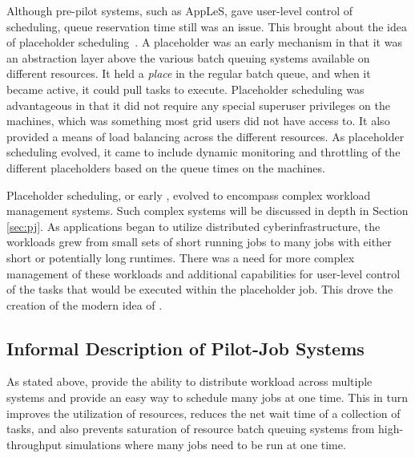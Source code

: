 \documentclass{sig-alternate}
\begin{document}
Although pre-pilot systems, such as AppLeS, gave user-level control of
scheduling, queue reservation time still was an issue. This brought
about the idea of placeholder
scheduling~\cite{Pinchak02practicalheterogeneous,
  Singh:2008:WTC:1341811.1341822}. A placeholder was an early \pilot
mechanism in that it was an abstraction layer above the various batch
queuing systems available on different resources. It held a
\textit{place} in the regular batch queue, and when it became active,
it could pull tasks to execute.  Placeholder scheduling was
advantageous in that it did not require any special superuser
privileges on the machines, which was something most grid users did
not have access to. It also provided a means of load balancing across
the different resources. As placeholder scheduling evolved, it came to
include dynamic monitoring and throttling of the different
placeholders based on the queue times on the machines.

Placeholder scheduling, or early \pilots, evolved to encompass complex
workload management systems. Such complex systems will be discussed in
depth in Section \ref{sec:pj}. As applications began to utilize
distributed cyberinfrastructure, the workloads grew from small sets of
short running jobs to many jobs with either short or potentially long
runtimes. There was a need for more complex management of these
workloads and additional capabilities for user-level control of the
tasks that would be executed within the placeholder job. This drove
the creation of the modern idea of \pilots.


\subsection{Informal Description of Pilot-Job Systems}
\label{ssec:informal}


As stated above, \pilotjobs provide the ability to distribute workload
across multiple systems and provide an easy way to schedule many jobs
at one time. This in turn improves the utilization of resources,
reduces the net wait time of a collection of tasks, and also prevents
saturation of resource batch queuing systems from high-throughput
simulations where many jobs need to be run at one time.
\end{document}
